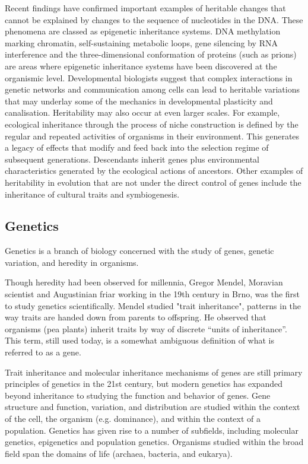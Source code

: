Recent findings have confirmed important examples of heritable changes that cannot be explained by
changes to the sequence of nucleotides in the DNA.
These phenomena are classed as epigenetic inheritance systems.
DNA methylation marking chromatin, self-sustaining metabolic loops, gene silencing by RNA 
interference and the three-dimensional conformation of proteins (such as prions) are areas where
epigenetic inheritance systems have been discovered at the organismic level. 
Developmental biologists suggest that complex interactions in genetic networks and communication 
among cells can lead to heritable variations that may underlay some of the mechanics in
developmental plasticity and canalisation.
Heritability may also occur at even larger scales. For example, ecological inheritance through
the process of niche construction is defined by the regular and repeated activities
of organisms in their environment. 
This generates a legacy of effects that modify and feed back into the selection regime of 
subsequent generations.
Descendants inherit genes plus environmental characteristics generated by the ecological
actions of ancestors.
Other examples of heritability in evolution that are not under the direct control of genes 
include the inheritance of cultural traits and symbiogenesis. 
\subsection{Genetics}
Genetics is a branch of biology concerned with the study of genes, genetic variation, and heredity 
in organisms.

Though heredity had been observed for millennia, Gregor Mendel, Moravian scientist and
Augustinian friar working in the 19th century in Brno, was the first to study genetics 
scientifically.
Mendel studied "trait inheritance", patterns in the way traits are handed down from parents to
offspring.
He observed that organisms (pea plants) inherit traits by way of discrete ``units of inheritance''.
This term, still used today, is a somewhat ambiguous definition of what is referred to as a gene.

Trait inheritance and molecular inheritance mechanisms of genes are still primary principles of
genetics in the 21st century, but modern genetics has expanded beyond inheritance to studying the 
function and behavior of genes.
Gene structure and function, variation, and distribution are studied within the context of the
cell, the organism (e.g. dominance), and within the context of a population.
Genetics has given rise to a number of subfields, including molecular genetics,
epigenetics and population genetics. Organisms studied within the broad field span the domains of
life (archaea, bacteria, and eukarya).

